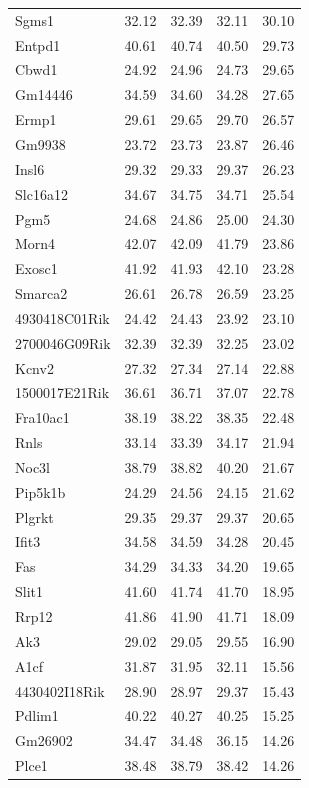\documentclass{article}
\begin{document}
\begin{table}[ht]
\begin{tabular}{lrrrr}
  Sgms1 & 32.12 & 32.39 & 32.11 & 30.10 \\ 
  Entpd1 & 40.61 & 40.74 & 40.50 & 29.73 \\ 
  Cbwd1 & 24.92 & 24.96 & 24.73 & 29.65 \\ 
  Gm14446 & 34.59 & 34.60 & 34.28 & 27.65 \\ 
  Ermp1 & 29.61 & 29.65 & 29.70 & 26.57 \\ 
  Gm9938 & 23.72 & 23.73 & 23.87 & 26.46 \\ 
  Insl6 & 29.32 & 29.33 & 29.37 & 26.23 \\ 
  Slc16a12 & 34.67 & 34.75 & 34.71 & 25.54 \\ 
  Pgm5 & 24.68 & 24.86 & 25.00 & 24.30 \\ 
  Morn4 & 42.07 & 42.09 & 41.79 & 23.86 \\ 
  Exosc1 & 41.92 & 41.93 & 42.10 & 23.28 \\ 
  Smarca2 & 26.61 & 26.78 & 26.59 & 23.25 \\ 
  4930418C01Rik & 24.42 & 24.43 & 23.92 & 23.10 \\ 
  2700046G09Rik & 32.39 & 32.39 & 32.25 & 23.02 \\ 
  Kcnv2 & 27.32 & 27.34 & 27.14 & 22.88 \\ 
  1500017E21Rik & 36.61 & 36.71 & 37.07 & 22.78 \\ 
  Fra10ac1 & 38.19 & 38.22 & 38.35 & 22.48 \\ 
  Rnls & 33.14 & 33.39 & 34.17 & 21.94 \\ 
  Noc3l & 38.79 & 38.82 & 40.20 & 21.67 \\ 
  Pip5k1b & 24.29 & 24.56 & 24.15 & 21.62 \\ 
  Plgrkt & 29.35 & 29.37 & 29.37 & 20.65 \\ 
  Ifit3 & 34.58 & 34.59 & 34.28 & 20.45 \\ 
  Fas & 34.29 & 34.33 & 34.20 & 19.65 \\ 
  Slit1 & 41.60 & 41.74 & 41.70 & 18.95 \\ 
  Rrp12 & 41.86 & 41.90 & 41.71 & 18.09 \\ 
  Ak3 & 29.02 & 29.05 & 29.55 & 16.90 \\ 
  A1cf & 31.87 & 31.95 & 32.11 & 15.56 \\ 
  4430402I18Rik & 28.90 & 28.97 & 29.37 & 15.43 \\ 
  Pdlim1 & 40.22 & 40.27 & 40.25 & 15.25 \\ 
  Gm26902 & 34.47 & 34.48 & 36.15 & 14.26 \\ 
  Plce1 & 38.48 & 38.79 & 38.42 & 14.26 \\ 

\end{tabular}
\end{table}
\end{document}
